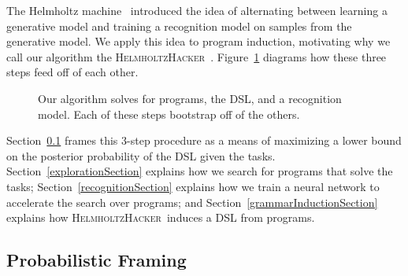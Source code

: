 \documentclass{article}
\newcommand{\system}{\textsc{HelmholtzHacker}~}
\begin{document}
The Helmholtz machine~\cite{dayan1995helmholtz} introduced the idea of alternating between
learning a generative model and training a recognition model on samples from the generative model.
We apply this idea to program induction, motivating why we call our algorithm the \system.
Figure~\ref{feeding} diagrams how these three steps feed off of each other.
\begin{figure}\centering
\caption{Our algorithm solves for programs, the DSL, and a recognition model. Each of these steps bootstrap off of the others.}  \label{feeding}
  \end{figure}

Section~\ref{mathematicalFraming} frames this 3-step procedure as
a means of maximizing a lower bound on the posterior probability of the DSL given the tasks.
Section~\ref{explorationSection} explains how we search for programs that solve the tasks;
Section~\ref{recognitionSection} explains how we train a neural network to accelerate the search over programs; and
Section~\ref{grammarInductionSection} explains how \system induces a DSL from programs.

\subsection{Probabilistic Framing}\label{mathematicalFraming}
\end{document}

